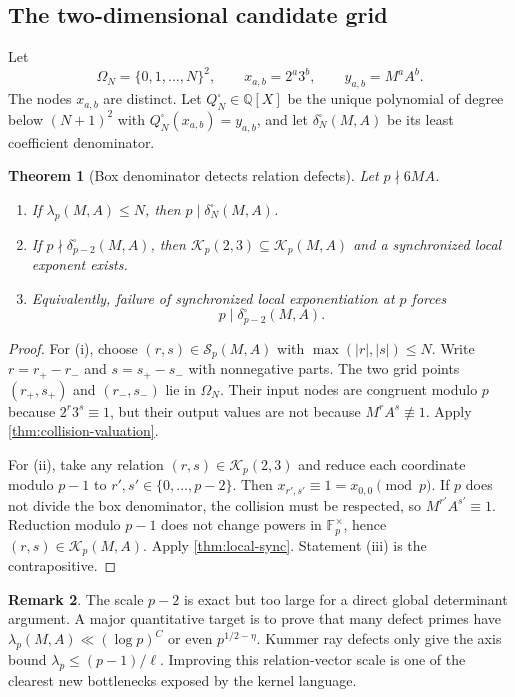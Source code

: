 \documentclass[11pt]{article}
\newtheorem{theorem}{Theorem}[section]
\theoremstyle{definition}
\newtheorem{remark}[theorem]{Remark}
\newcommand{\Q}{\mathbb Q}
\newcommand{\F}{\mathbb F}
\newcommand{\Rel}{\mathcal K}
\newcommand{\Sync}{\mathcal S}
\newcommand{\boxdelta}{\delta^{\square}}
\begin{document}
\subsection{The two-dimensional candidate grid}

Let
\[
 \Omega_N=\{0,1,\ldots,N\}^2,
 \qquad
 x_{a,b}=2^a3^b,
 \qquad
 y_{a,b}=M^aA^b.
\]
The nodes $x_{a,b}$ are distinct.  Let $Q_N^\square\in\Q[X]$ be the unique polynomial of
degree below $(N+1)^2$ with
$Q_N^\square(x_{a,b})=y_{a,b}$, and let
$\boxdelta_N(M,A)$ be its least coefficient denominator.

\begin{theorem}[Box denominator detects relation defects]
\label{thm:box-detects}
Let $p\nmid6MA$.
\begin{enumerate}[label=(\roman*)]
\item If $\lambda_p(M,A)\le N$, then $p\mid\boxdelta_N(M,A)$.
\item If $p\nmid\boxdelta_{p-2}(M,A)$, then
$\Rel_p(2,3)\subseteq\Rel_p(M,A)$ and a synchronized local exponent exists.
\item Equivalently, failure of synchronized local exponentiation at $p$ forces
\begin{equation}
 p\mid\boxdelta_{p-2}(M,A).
 \label{eq:p-divides-box}
\end{equation}
\end{enumerate}
\end{theorem}

\begin{proof}
For (i), choose $(r,s)\in\Sync_p(M,A)$ with
$\max(|r|,|s|)\le N$.  Write
$r=r_+-r_-$ and $s=s_+-s_-$ with nonnegative parts.  The two grid points
$(r_+,s_+)$ and $(r_-,s_-)$ lie in $\Omega_N$.  Their input nodes are congruent modulo $p$
because $2^r3^s\equiv1$, but their output values are not because
$M^rA^s\not\equiv1$.  Apply \cref{thm:collision-valuation}.

For (ii), take any relation $(r,s)\in\Rel_p(2,3)$ and reduce each coordinate modulo $p-1$ to
$r',s'\in\{0,\ldots,p-2\}$.  Then
$x_{r',s'}\equiv1=x_{0,0}\pmod p$.  If $p$ does not divide the box denominator, the collision
must be respected, so $M^{r'}A^{s'}\equiv1$.  Reduction modulo $p-1$ does not change powers in
$\F_p^\times$, hence $(r,s)\in\Rel_p(M,A)$.  Apply \cref{thm:local-sync}.
Statement (iii) is the contrapositive.
\end{proof}

\begin{remark}
The scale $p-2$ is exact but too large for a direct global determinant argument.  A major
quantitative target is to prove that many defect primes have
$\lambda_p(M,A)\ll(\log p)^C$ or even $p^{1/2-\eta}$.  Kummer ray defects only give the axis
bound $\lambda_p\le(p-1)/\ell$.  Improving this relation-vector scale is one of the clearest
new bottlenecks exposed by the kernel language.
\end{remark}
\end{document}
